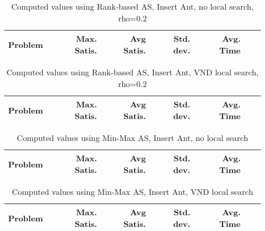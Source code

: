 \documentclass{article}
\begin{document}
\begin{table}
  \caption{Computed values using Rank-based AS, Insert Ant, no local search, rho=0.2}
  \label{tab:conf10}
  \setlength{\tabcolsep}{1.4mm}
  \centering
  \begin{tabular}{lrrrrrr}
    \bfseries Problem &
    \bfseries Max. Satis. &
    \bfseries Avg Satis. &
    \bfseries Std. dev. &
    \bfseries Avg. Time 
    \\\hline
    
    \hline
  \end{tabular}

\end{table}


\begin{table}
  \caption{Computed values using Rank-based AS, Insert Ant, VND local search, rho=0.2}
  \label{tab:conf11}
  \setlength{\tabcolsep}{1.4mm}
  \centering
  \begin{tabular}{lrrrrrr}
    \bfseries Problem &
    \bfseries Max. Satis. &
    \bfseries Avg Satis. &
    \bfseries Std. dev. &
    \bfseries Avg. Time 
    \\\hline
    
    \hline
  \end{tabular}

\end{table}

\clearpage

\begin{table}
  \caption{Computed values using Min-Max AS, Insert Ant, no local search}
  \label{tab:conf12}
  \setlength{\tabcolsep}{1.4mm}
  \centering
  \begin{tabular}{lrrrrrr}
    \bfseries Problem &
    \bfseries Max. Satis. &
    \bfseries Avg Satis. &
    \bfseries Std. dev. &
    \bfseries Avg. Time 
    \\\hline
    
    \hline
  \end{tabular}

\end{table}


\begin{table}
  \caption{Computed values using Min-Max AS, Insert Ant, VND local search}
  \label{tab:conf13}
  \setlength{\tabcolsep}{1.4mm}
  \centering
  \begin{tabular}{lrrrrrr}
    \bfseries Problem &
    \bfseries Max. Satis. &
    \bfseries Avg Satis. &
    \bfseries Std. dev. &
    \bfseries Avg. Time 
    \\\hline
    
    \hline
  \end{tabular}

\end{table}
\end{document}
